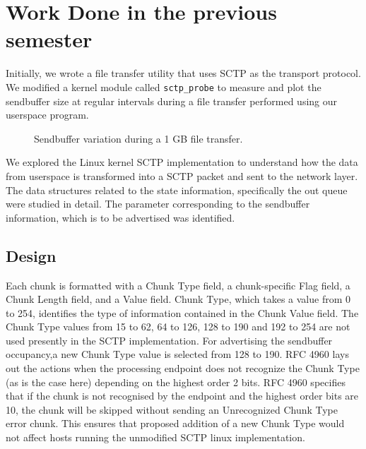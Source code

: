 \documentclass[a4paper,11pt]{article}
\begin{document}
\section{Work Done in the previous semester}
Initially, we wrote a file transfer utility that uses SCTP as the
transport protocol.
We modified a kernel module called \texttt{sctp\_probe} to measure and plot
the sendbuffer size at regular intervals during a file transfer performed
using our userspace program.

\begin{figure}[h]
  \centering
  \caption{Sendbuffer variation during a 1 GB file transfer.}
\end{figure}

We explored the Linux kernel SCTP implementation to understand how the
data from userspace is transformed into a SCTP packet and sent to the network
layer.
The data structures related to the state information, specifically
the out queue were studied in detail. The parameter corresponding to the
sendbuffer information, which is to be advertised was identified.

\clearpage

\subsection{Design}
Each chunk is formatted with a Chunk Type field, a chunk-specific Flag field,
a Chunk Length field, and a Value field. Chunk Type, which takes a value
from 0 to 254, identifies the type of information contained in the Chunk
Value field. The Chunk Type values from 15 to 62, 64 to 126, 128 to 190 and
192 to 254 are not used presently in the SCTP implementation.
For advertising the sendbuffer occupancy,a new Chunk Type value is selected
from 128 to 190. RFC 4960 \cite{rfc4960} lays out the actions when
the processing endpoint does not recognize the Chunk Type (as is
the case here) depending on the highest order 2 bits. RFC 4960 \cite{rfc4960}
specifies that if the chunk is not recognised by the endpoint and the
highest order bits are 10, the chunk will be skipped without sending
an Unrecognized Chunk Type error chunk. This ensures that proposed
addition of a new Chunk Type would not affect hosts running the
unmodified SCTP linux implementation.
\end{document}
